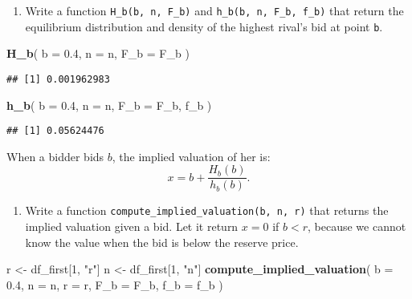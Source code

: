 \documentclass[
]{book}
\newenvironment{Shaded}{\begin{snugshade}}{\end{snugshade}}
\newcommand{\AttributeTok}[1]{\textcolor[rgb]{0.13,0.29,0.53}{#1}}
\newcommand{\DecValTok}[1]{\textcolor[rgb]{0.00,0.00,0.81}{#1}}
\newcommand{\FloatTok}[1]{\textcolor[rgb]{0.00,0.00,0.81}{#1}}
\newcommand{\FunctionTok}[1]{\textcolor[rgb]{0.13,0.29,0.53}{\textbf{#1}}}
\newcommand{\NormalTok}[1]{#1}
\newcommand{\OtherTok}[1]{\textcolor[rgb]{0.56,0.35,0.01}{#1}}
\newcommand{\StringTok}[1]{\textcolor[rgb]{0.31,0.60,0.02}{#1}}
\providecommand{\tightlist}{%
  \setlength{\itemsep}{0pt}\setlength{\parskip}{0pt}}
\begin{document}
\begin{enumerate}
\def\labelenumi{\arabic{enumi}.}
\setcounter{enumi}{10}
\tightlist
\item
  Write a function \texttt{H\_b(b,\ n,\ F\_b)} and \texttt{h\_b(b,\ n,\ F\_b,\ f\_b)} that return the equilibrium distribution and density of the highest rival's bid at point \texttt{b}.
\end{enumerate}

\begin{Shaded}
\begin{Highlighting}[]
\FunctionTok{H\_b}\NormalTok{(}
  \AttributeTok{b =} \FloatTok{0.4}\NormalTok{,}
  \AttributeTok{n =}\NormalTok{ n,}
  \AttributeTok{F\_b =}\NormalTok{ F\_b}
\NormalTok{  )}
\end{Highlighting}
\end{Shaded}

\begin{verbatim}
## [1] 0.001962983
\end{verbatim}

\begin{Shaded}
\begin{Highlighting}[]
\FunctionTok{h\_b}\NormalTok{(}
  \AttributeTok{b =} \FloatTok{0.4}\NormalTok{,}
  \AttributeTok{n =}\NormalTok{ n,}
  \AttributeTok{F\_b =}\NormalTok{ F\_b, }
\NormalTok{  f\_b}
\NormalTok{  )}
\end{Highlighting}
\end{Shaded}

\begin{verbatim}
## [1] 0.05624476
\end{verbatim}

When a bidder bids \(b\), the implied valuation of her is:
\[
x = b + \frac{H_b(b)}{h_b(b)}.
\]

\begin{enumerate}
\def\labelenumi{\arabic{enumi}.}
\setcounter{enumi}{11}
\tightlist
\item
  Write a function \texttt{compute\_implied\_valuation(b,\ n,\ r)} that returns the implied valuation given a bid. Let it return \(x = 0\) if \(b < r\), because we cannot know the value when the bid is below the reserve price.
\end{enumerate}

\begin{Shaded}
\begin{Highlighting}[]
\NormalTok{r }\OtherTok{\textless{}{-}}\NormalTok{ df\_first[}\DecValTok{1}\NormalTok{, }\StringTok{"r"}\NormalTok{]}
\NormalTok{n }\OtherTok{\textless{}{-}}\NormalTok{ df\_first[}\DecValTok{1}\NormalTok{, }\StringTok{"n"}\NormalTok{]}
\FunctionTok{compute\_implied\_valuation}\NormalTok{(}
  \AttributeTok{b =} \FloatTok{0.4}\NormalTok{,}
  \AttributeTok{n =}\NormalTok{ n, }
  \AttributeTok{r =}\NormalTok{ r, }
  \AttributeTok{F\_b =}\NormalTok{ F\_b, }
  \AttributeTok{f\_b =}\NormalTok{ f\_b}
\NormalTok{  )}
\end{Highlighting}
\end{Shaded}
\end{document}
